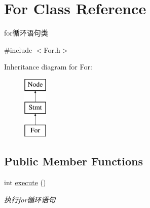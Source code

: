 \hypertarget{class_for}{}\section{For Class Reference}
\label{class_for}


for循环语句类  




{\ttfamily \#include $<$For.\+h$>$}

Inheritance diagram for For\+:\begin{figure}[H]
\begin{center}
\leavevmode
\includegraphics[height=3.000000cm]{class_for}
\end{center}
\end{figure}
\subsection*{Public Member Functions}
\begin{DoxyCompactItemize}
\item 
\mbox{\label{class_for_ad099d6d48c640dd5127285e59bbaba15}} 
int \hyperlink{class_for_ad099d6d48c640dd5127285e59bbaba15}{execute} ()
\begin{DoxyCompactList}\small\item\em 执行for循环语句 \end{DoxyCompactList}\end{DoxyCompactItemize}
